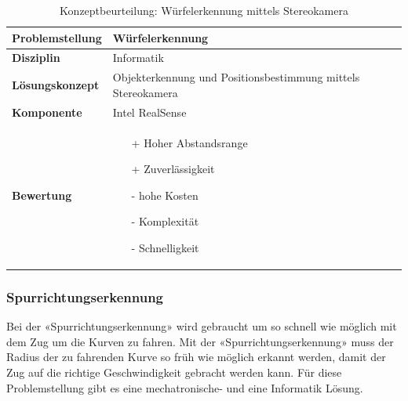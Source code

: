 \documentclass[../../main.tex]{subfiles}
\begin{document}
    \begin{flushleft}
        \begin{table}[H]
        \begin{tabular}{ | l | p{11cm} |}
        \hline
        \textbf{Problemstellung} & Würfelerkennung \\ \hline
        \textbf{Disziplin} & Informatik \\ \hline
        \textbf{Lösungskonzept} & Objekterkennung und Positionsbestimmung mittels Stereokamera \\ \hline
        \textbf{Komponente} & Intel RealSense \\ \hline
        \textbf{Bewertung} &  \begin{itemize}
                                \item[+] Hoher Abstandsrange
                                \item[+] Zuverlässigkeit
                                \item[-] hohe Kosten 
                                \item[-] Komplexität
                                \item[-] Schnelligkeit   
                              \end{itemize} \\ \hline
        \end{tabular}
        \caption{Konzeptbeurteilung: Würfelerkennung mittels Stereokamera}
        \label{tab:konzept_wurfel_Stereokamera}
    \end{table}
    \end{flushleft}


    \subsubsection{Spurrichtungserkennung}
	Bei der «Spurrichtungserkennung» wird gebraucht um so schnell wie möglich mit dem Zug um die Kurven zu fahren. Mit der «Spurrichtungserkennung» muss der Radius der zu fahrenden Kurve so früh wie möglich erkannt werden, damit der Zug auf die richtige Geschwindigkeit gebracht werden kann. Für diese Problemstellung gibt es eine mechatronische- und eine Informatik Lösung.\\
\end{document}
